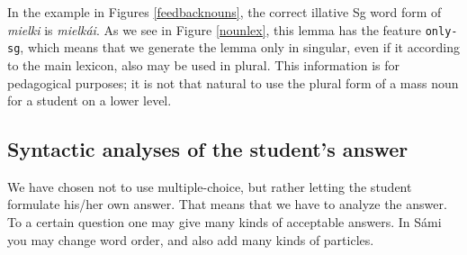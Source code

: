 \documentclass[11pt]{article}
\begin{document}
%


In the example in Figures \ref{feedbacknouns}, the correct illative Sg word form of \textit{mielki} is \textit{mielkái}. As we see in Figure \ref{nounlex}, this lemma has the feature \texttt{only-sg}, which means that we generate the lemma only in singular, even if it according to the main lexicon, also may be used in plural. This information is for pedagogical purposes; it is not that natural to use the plural form of a mass noun for a student on a lower level.


\subsection{Syntactic analyses of the student's answer} \label{sentencefeedback}
We have chosen not to use multiple-choice, but rather letting the student formulate his/her own answer. That means that we have to analyze the answer. To a certain question one may give many kinds of acceptable answers. In Sámi you may change word order, and also add many kinds of particles. \\
\end{document}
